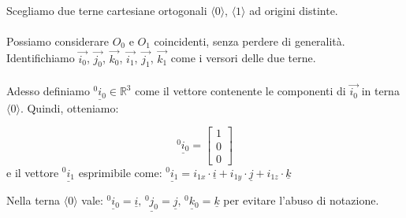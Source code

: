 \paragraph{}
Scegliamo due terne cartesiane ortogonali $\langle0\rangle$, $\langle1\rangle$ ad origini distinte.\\


\paragraph{}
Possiamo considerare $O_{0}$ e $O_{1}$ coincidenti, senza perdere di generalità. \\
Identifichiamo $\vec{i_{0}}$, $\vec{j_{0}}$, $\vec{k_{0}}$, $\vec{i_{1}}$, $\vec{j_{1}}$, $\vec{k_{1}}$ come i versori delle due terne. 
\paragraph{}
Adesso definiamo $\underline{^0i_{0}} \in \mathbb{R}^{3}$ come il vettore contenente le componenti di $\vec{i_{0}}$ in terna $\langle0\rangle$. Quindi, otteniamo:

\[\underline{^0i_{0}} = \begin{bmatrix}1\\0\\0\end{bmatrix}\]e il vettore $\underline{^0i_{1}}$ esprimibile come:
$\underline{^0i_{1}} = i_{1x}\cdot\underline{i} + i_{1y}\cdot\underline{j} + i_{1z}\cdot\underline{k}$

Nella terna $\langle0\rangle$ vale: $\underline{^0i_{0}} = \underline{i}, \, \underline{^0j_{0}} = \underline{j},\, \underline{^0k_{0}} = \underline{k}$ per evitare l'abuso di notazione.

